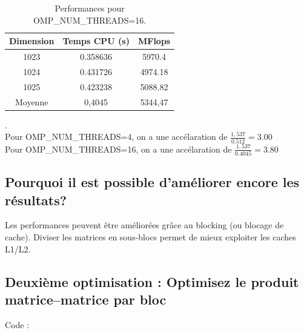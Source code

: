 \documentclass[a4paper,13pt]{book}
\begin{document}
\begin{table}[h!]
    \begin{center}
    \begin{tabular}{|c|c|c|}
        \hline
        Dimension & Temps CPU (s) & MFlops \\ \hline
        1023      & 0.358636       & 5970.4 \\ \hline
        1024      & 0.431726       & 4974.18 \\ \hline
        1025      & 0.423238        & 5088.82 \\ \hline
        Moyenne      & 0,4045        & 5344,47 \\ \hline
    \end{tabular}
    \caption{Performances pour OMP\_NUM\_THREADS=16.}
\end{center}
\end{table}.\\
Pour OMP\_NUM\_THREADS=4, on a une accélaration de $\frac{1,537}{0.512}=3.00$\\
Pour OMP\_NUM\_THREADS=16, on a une accélaration de $\frac{1,537}{0.4045}=3.80$

\subsection{Pourquoi il est possible d'améliorer encore les résultats?}

    Les performances peuvent être améliorées grâce au blocking  (ou blocage de cache).
    Diviser les matrices en sous-blocs permet de mieux exploiter les caches L1/L2.

\subsection{Deuxième optimisation : Optimisez le produit matrice–matrice par bloc}

Code : \\
\end{document}
